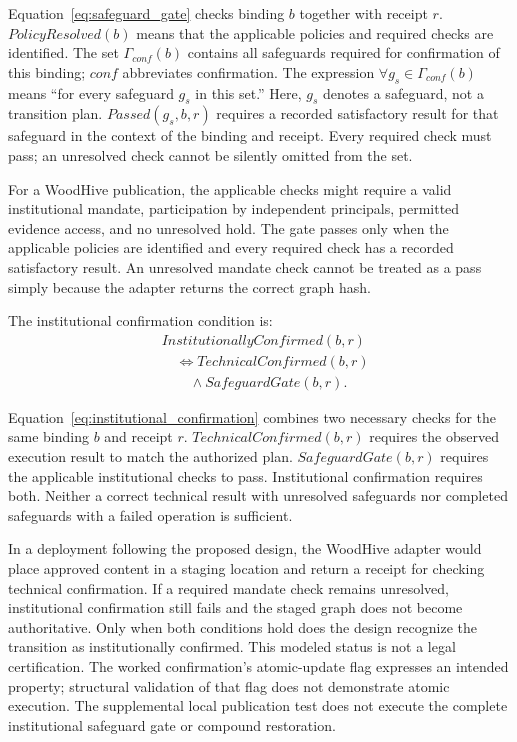 \documentclass[journal]{IEEEtran}
\begin{document}
Equation~\ref{eq:safeguard_gate} checks binding $b$ together with
receipt $r$. $PolicyResolved(b)$ means that the applicable policies
and required checks are identified. The set $\Gamma_{conf}(b)$
contains all safeguards required for confirmation of this binding;
$conf$ abbreviates confirmation. The expression
$\forall g_s\in\Gamma_{conf}(b)$ means ``for every safeguard
$g_s$ in this set.'' Here, $g_s$ denotes a safeguard, not a
transition plan. $Passed(g_s,b,r)$ requires a recorded satisfactory
result for that safeguard in the context of the binding and receipt.
Every required check must pass;
an unresolved check cannot be silently omitted from the set.

For a WoodHive publication, the applicable checks might require
a valid institutional mandate, participation by independent
principals, permitted evidence access, and no unresolved hold.
The gate passes only when the applicable policies are identified
and every required check has a recorded satisfactory result.
An unresolved mandate check cannot be treated as a pass simply
because the adapter returns the correct graph hash.

The institutional confirmation condition is:
\begin{equation}
\label{eq:institutional_confirmation}
\begin{aligned}
&InstitutionallyConfirmed(b,r)\\
&\quad\iff TechnicalConfirmed(b,r)\\
&\qquad\land SafeguardGate(b,r).
\end{aligned}
\end{equation}

Equation~\ref{eq:institutional_confirmation} combines two necessary
checks for the same binding $b$ and receipt $r$.
$TechnicalConfirmed(b,r)$ requires the observed execution result
to match the authorized plan. $SafeguardGate(b,r)$ requires the
applicable institutional checks to pass. Institutional
confirmation requires both. Neither a correct technical
result with unresolved safeguards nor completed safeguards with
a failed operation is sufficient.

In a deployment following the proposed design, the WoodHive adapter
would place approved content in a staging location and return a
receipt for checking technical confirmation. If a required mandate check remains
unresolved, institutional confirmation still fails and the staged
graph does not become authoritative. Only when both conditions
hold does the design recognize the transition as institutionally
confirmed. This modeled status is not a legal certification. The worked
confirmation's atomic-update flag expresses an intended property;
structural validation of that flag does not demonstrate atomic
execution. The supplemental local publication test does not execute
the complete institutional safeguard gate or compound restoration.
\end{document}
